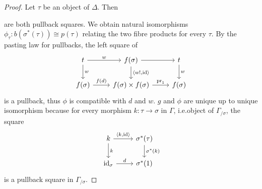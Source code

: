 \documentclass[a4paper]{article}
\theoremstyle{remark}
\theoremstyle{definition}
\begin{document}
\begin{proof}
  Let $\tau$ be an object of $\Delta$.
  Then
  are both pullback squares.
  We obtain natural isomorphisms $\phi_\tau : b(\sigma^*(\tau)) \cong p(\tau)$ relating the two fibre products for every $\tau$.
  By the pasting law for pullbacks, the left square of
  \begin{equation}
    \begin{tikzcd}
      t \arrow[r, "w"] \arrow[d, "w"] & f(\sigma) \arrow[d, "{\langle w!, \mathrm{id}\rangle}"] \arrow[r] & t \arrow[d, "w"] \\
      f(\sigma) \arrow[r, "f(d)"] & f(\sigma) \times f(\sigma) \arrow[r, "\mathrm{pr}_1"] & f(\sigma)
    \end{tikzcd}
  \end{equation}
  is a pullback, thus $\phi$ is compatible with $d$ and $w$.
  $g$ and $\phi$ are unique up to unique isomorphism because for every morphism $k : \tau \rightarrow \sigma$ in $\Gamma$, i.e.\@ object of $\Gamma_{/ \sigma}$, the square
  \begin{equation}
    \begin{tikzcd}
      k \arrow[r, "{\langle k, \mathrm{id} \rangle}"] \arrow[d, "k"] & \sigma^*(\tau) \arrow[d, "\sigma^*(k)"] \\
      \mathrm{id}_\sigma \arrow[r, "d"] & \sigma^*(1)
    \end{tikzcd}
  \end{equation}
  is a pullback square in $\Gamma_{/ \sigma}$.
\end{proof}
\end{document}

